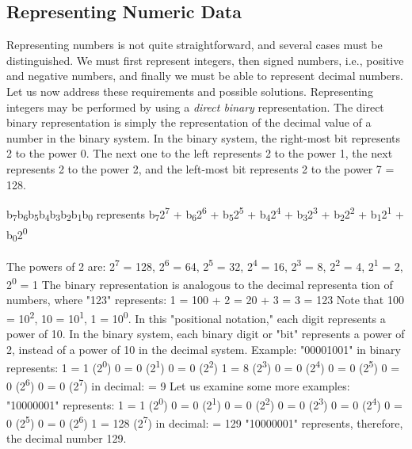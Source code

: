 \documentclass{book}
\begin{document}
\subsection*{Representing Numeric Data}

Representing numbers is not quite straightforward, and several
cases must be distinguished. We must first represent integers, then
signed numbers, i.e., positive and negative numbers, and finally we
must be able to represent decimal numbers. Let us now address
these requirements and possible solutions.
Representing integers may be performed by using a \textit{direct
binary} representation. The direct binary representation is simply
the representation of the decimal value of a number in the binary
system. In the binary system, the right-most bit represents 2 to
the power 0. The next one to the left represents 2 to the power 1,
the next represents 2 to the power 2, and the left-most bit
represents 2 to the power 7 = 128.

b\textsubscript{7}b\textsubscript{6}b\textsubscript{5}b\textsubscript{4}b\textsubscript{3}b\textsubscript{2}b\textsubscript{1}b\textsubscript{0}
represents
b\textsubscript{7}2\textsuperscript{7} + b\textsubscript{6}2\textsuperscript{6} + b\textsubscript{5}2\textsuperscript{5} + b\textsubscript{4}2\textsuperscript{4} + b\textsubscript{3}2\textsuperscript{3} + b\textsubscript{2}2\textsuperscript{2} + b\textsubscript{1}2\textsuperscript{1} + b\textsubscript{0}2\textsuperscript{0}

The powers of 2 are:
2\textsuperscript{7} = 128, 2\textsuperscript{6} = 64, 2\textsuperscript{5} = 32, 2\textsuperscript{4} = 16, 2\textsuperscript{3} = 8, 2\textsuperscript{2} = 4, 2\textsuperscript{1} = 2, 2\textsuperscript{0} = 1
The binary representation is analogous to the decimal representa
tion of numbers, where "123" represents:
1  = 100
+ 2  = 20
+ 3  = 3
= 123
Note that 100 = 10\textsuperscript{2}, 10 = 10\textsuperscript{1}, 1 = 10\textsuperscript{0}.
In this "positional notation," each digit represents a power of 10.
In the binary system, each binary digit or "bit" represents a power
of 2, instead of a power of 10 in the decimal system.
Example: "00001001" in binary represents:
1  = 1 (2\textsuperscript{0})
0  = 0 (2\textsuperscript{1})
0  = 0 (2\textsuperscript{2})
1  = 8 (2\textsuperscript{3})
0  = 0 (2\textsuperscript{4})
0  = 0 (2\textsuperscript{5})
0  = 0 (2\textsuperscript{6})
0  = 0 (2\textsuperscript{7})
in decimal: = 9
Let us examine some more examples:
"10000001" represents:
1  = 1 (2\textsuperscript{0})
0  = 0 (2\textsuperscript{1})
0  = 0 (2\textsuperscript{2})
0  = 0 (2\textsuperscript{3})
0  = 0 (2\textsuperscript{4})
0  = 0 (2\textsuperscript{5})
0  = 0 (2\textsuperscript{6})
1  = 128 (2\textsuperscript{7})
in decimal: = 129
"10000001" represents, therefore, the decimal number 129.
\end{document}
